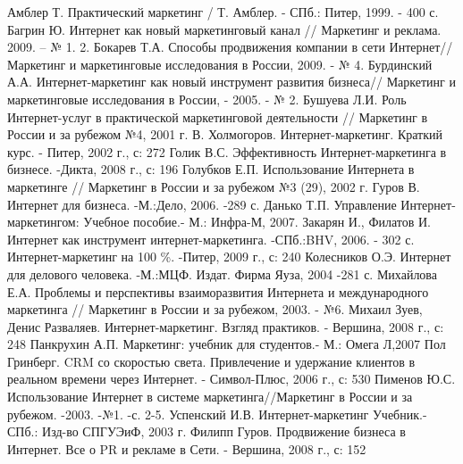 \documentclass[a4paper,english,russian]{G2-105}
\begin{document}
\newpage
\begin{thebibliography}{1}
	 Амблер Т. Практический маркетинг / Т. Амблер. - СПб.: Питер, 1999. - 400 с.
 Багрин Ю. Интернет как новый маркетинговый канал // Маркетинг и реклама. 2009. -- № 1. 2.
 Бокарев Т.А. Способы продвижения компании в сети Интернет// Маркетинг и маркетинговые исследования в России, 2009. - № 4.
 Бурдинский А.А. Интернет-маркетинг как новый инструмент развития бизнеса// Маркетинг и маркетинговые исследования в России, - 2005. - № 2.
 Бушуева Л.И. Роль Интернет-услуг в практической маркетинговой деятельности // Маркетинг в России и за рубежом №4, 2001 г.
 В. Холмогоров. Интернет-маркетинг. Краткий курс. - Питер, 2002 г., с: 272
 Голик В.С. Эффективность Интернет-маркетинга в бизнесе. -Дикта, 2008 г., с: 196
 Голубков Е.П. Использование Интернета в маркетинге // Маркетинг в России и за рубежом №3 (29), 2002 г.
 Гуров В. Интернет для бизнеса. -М.:Дело, 2006. -289 с.
 Данько Т.П. Управление Интернет-маркетингом: Учебное пособие.- М.: Инфра-М, 2007.
 Закарян И., Филатов И. Интернет как инструмент интернет-маркетинга. -СПб.:BHV, 2006. - 302 с.
 Интернет-маркетинг на 100 \%. -Питер, 2009 г., с: 240
 Колесников О.Э. Интернет для делового человека. -М.:МЦФ. Издат. Фирма Яуза, 2004 -281 с.
 Михайлова Е.А. Проблемы и перспективы взаиморазвития Интернета и международного маркетинга // Маркетинг в России и за рубежом, 2003. - №6.
 Михаил Зуев, Денис Разваляев. Интернет-маркетинг. Взгляд практиков. - Вершина, 2008 г., с: 248
 Панкрухин А.П. Маркетинг: учебник для студентов.- М.: Омега Л,2007
 Пол Гринберг. CRM со скоростью света. Привлечение и удержание клиентов в реальном времени через Интернет. - Символ-Плюс, 2006 г., с: 530
 Пименов Ю.С. Использование Интернет в системе маркетинга//Маркетинг в России и за рубежом. -2003. -№1. -с. 2-5.
 Успенский И.В. Интернет-маркетинг Учебник.- СПб.: Изд-во СПГУЭиФ, 2003 г.
 Филипп Гуров. Продвижение бизнеса в Интернет. Все о PR и рекламе в Сети. - Вершина, 2008 г., с: 152
\end{thebibliography}
\end{document}

